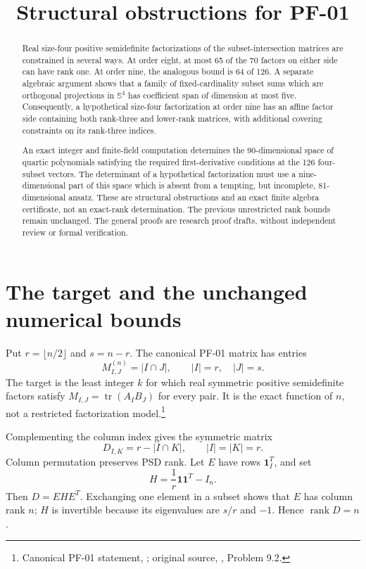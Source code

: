 \documentclass[11pt]{article}
\title{Structural obstructions for PF-01}
\author{}\date{}
\theoremstyle{remark}\newtheorem{remark}[theorem]{Remark}
\newcommand{\Sym}{\mathbb S}
\newcommand{\tr}{\operatorname{tr}}
\newcommand{\rank}{\operatorname{rank}}
\newcommand{\one}{\mathbf 1}
\begin{document}
\maketitle
\vspace{-2em}
\begin{abstract}
Real size-four positive semidefinite factorizations of the subset-intersection matrices are constrained in several ways. At order eight, at most 65 of the 70 factors on either side can have rank one. At order nine, the analogous bound is 64 of 126. A separate algebraic argument shows that a family of fixed-cardinality subset sums which are orthogonal projections in $\Sym^4$ has coefficient span of dimension at most five. Consequently, a hypothetical size-four factorization at order nine has an affine factor side containing both rank-three and lower-rank matrices, with additional covering constraints on its rank-three indices.

An exact integer and finite-field computation determines the 90-dimensional space of quartic polynomials satisfying the required first-derivative conditions at the 126 four-subset vectors. The determinant of a hypothetical factorization must use a nine-dimensional part of this space which is absent from a tempting, but incomplete, 81-dimensional ansatz. These are structural obstructions and an exact finite algebra certificate, not an exact-rank determination. The previous unrestricted rank bounds remain unchanged. The general proofs are research proof drafts, without independent review or formal verification.
\end{abstract}

\section{The target and the unchanged numerical bounds}
Put $r=\lfloor n/2\rfloor$ and $s=n-r$. The canonical PF-01 matrix has entries
\[
 M^{(n)}_{I,J}=|I\cap J|,\qquad |I|=r,\quad |J|=s.
\]
The target is the least integer $k$ for which real symmetric positive semidefinite factors satisfy $M_{I,J}=\tr(A_I B_J)$ for every pair. It is the exact function of $n$, not a restricted factorization model.\footnote{Canonical PF-01 statement, \cite{repo}; original source, \cite{fawzi}, Problem 9.2.}

Complementing the column index gives the symmetric matrix
\begin{equation}\label{eq:D}
 D_{I,K}=r-|I\cap K|,\qquad |I|=|K|=r.
\end{equation}
Column permutation preserves PSD rank. Let $E$ have rows $\one_I^T$, and set
\[
 H=\frac1r\one\one^T-I_n.
\]
Then $D=EHE^T$. Exchanging one element in a subset shows that $E$ has column rank $n$; $H$ is invertible because its eigenvalues are $s/r$ and $-1$. Hence $\rank D=n$.
\end{document}
